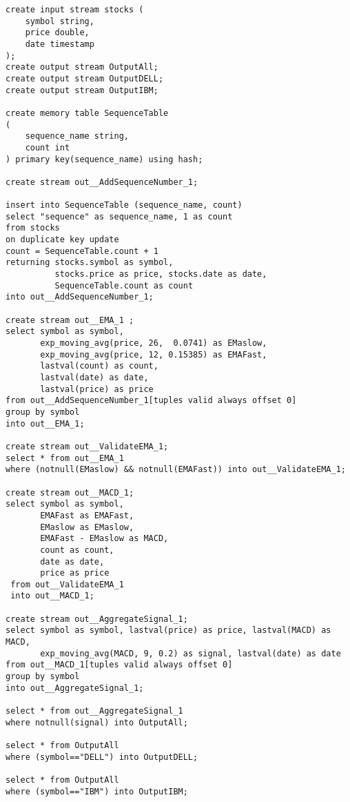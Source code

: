 \begin{lstlisting}
create input stream stocks (
    symbol string,
    price double,
    date timestamp
);
create output stream OutputAll;
create output stream OutputDELL;
create output stream OutputIBM;

create memory table SequenceTable
(
    sequence_name string,
    count int
) primary key(sequence_name) using hash;

create stream out__AddSequenceNumber_1;

insert into SequenceTable (sequence_name, count)
select "sequence" as sequence_name, 1 as count
from stocks
on duplicate key update
count = SequenceTable.count + 1
returning stocks.symbol as symbol,
          stocks.price as price, stocks.date as date,
          SequenceTable.count as count
into out__AddSequenceNumber_1;

create stream out__EMA_1 ;
select symbol as symbol,
       exp_moving_avg(price, 26,  0.0741) as EMaslow,
       exp_moving_avg(price, 12, 0.15385) as EMAFast,
       lastval(count) as count,
       lastval(date) as date,
       lastval(price) as price
from out__AddSequenceNumber_1[tuples valid always offset 0]
group by symbol
into out__EMA_1;

create stream out__ValidateEMA_1;
select * from out__EMA_1
where (notnull(EMaslow) && notnull(EMAFast)) into out__ValidateEMA_1;

create stream out__MACD_1;
select symbol as symbol,
       EMAFast as EMAFast,
       EMaslow as EMaslow,
       EMAFast - EMaslow as MACD,
       count as count,
       date as date,
       price as price
 from out__ValidateEMA_1
 into out__MACD_1;

create stream out__AggregateSignal_1;
select symbol as symbol, lastval(price) as price, lastval(MACD) as MACD,
       exp_moving_avg(MACD, 9, 0.2) as signal, lastval(date) as date
from out__MACD_1[tuples valid always offset 0]
group by symbol
into out__AggregateSignal_1;

select * from out__AggregateSignal_1
where notnull(signal) into OutputAll;

select * from OutputAll
where (symbol=="DELL") into OutputDELL;

select * from OutputAll
where (symbol=="IBM") into OutputIBM;


\end{lstlisting}
